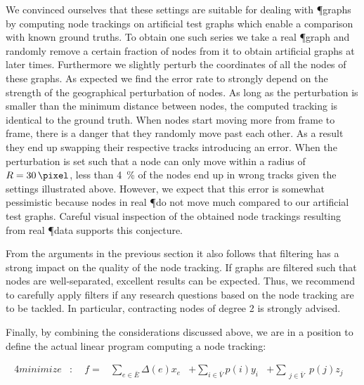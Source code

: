 		We convinced ourselves that these settings are suitable for dealing with \P graphs by computing node trackings on artificial test graphs which enable a comparison with known ground truths. To obtain one such series we take a real \P graph and randomly remove a certain fraction of nodes from it to obtain artificial graphs at later times. Furthermore we slightly perturb the coordinates of all the nodes of these graphs. As expected we find the error rate to strongly depend on the strength of the geographical perturbation of nodes. As long as the perturbation is smaller than the minimum distance between nodes, the computed tracking is identical to the ground truth. When nodes start moving more from frame to frame, there is a danger that they randomly move past each other. As a result they end up swapping their respective tracks introducing an error. When the perturbation is set such that a node can only move within a radius of $R = \SI{30}{\pixel}$, less than \SI{4}{\percent} of the nodes end up in wrong tracks given the settings illustrated above. However, we expect that this error is somewhat pessimistic because nodes in real \P do not move much compared to our artificial test graphs. Careful visual inspection of the obtained node trackings resulting from real \P data supports this conjecture.

		From the arguments in the previous section it also follows that filtering has a strong impact on the quality of the node tracking. If graphs are filtered such that nodes are well-separated, excellent results can be expected. Thus, we recommend to carefully apply filters if any research questions based on the node tracking are to be tackled. In particular, contracting nodes of degree 2 is strongly advised.

		Finally, by combining the considerations discussed above, we are in a position to define the actual linear program computing a node tracking:

		\begin{alignat*}{4}
		minimize & : & \ \ f = &\sum_{ e \in \bar{E} } \Delta(e) x_{e}  &+  \sum_{ i \in \bar{V}} p(i) y_{i} & +   \sum_{ \substack{j \in \bar{V}}} p(j) z_{j} &  
		\end{alignat*}

